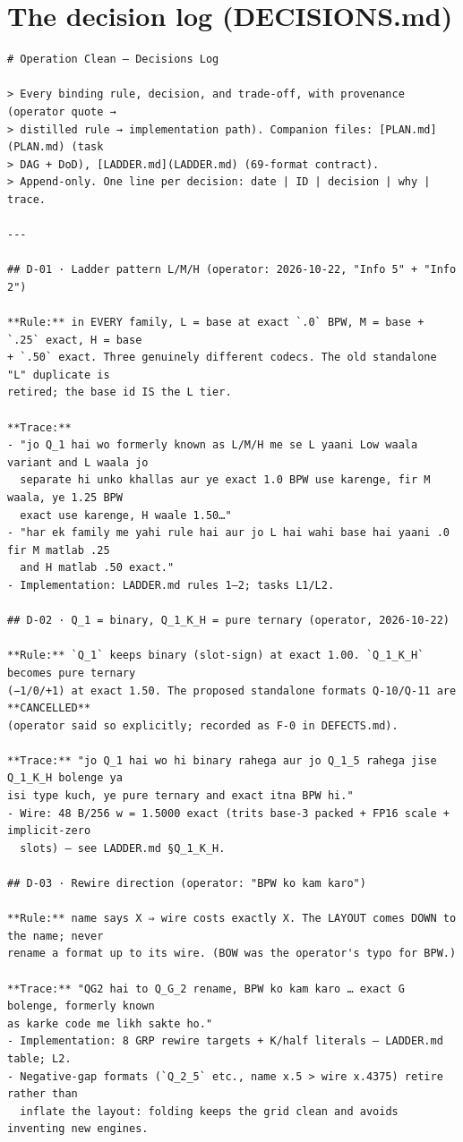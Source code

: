 \section*{The decision log (DECISIONS.md)}
\begin{verbatim}
# Operation Clean — Decisions Log

> Every binding rule, decision, and trade-off, with provenance (operator quote →
> distilled rule → implementation path). Companion files: [PLAN.md](PLAN.md) (task
> DAG + DoD), [LADDER.md](LADDER.md) (69-format contract).
> Append-only. One line per decision: date | ID | decision | why | trace.

---

## D-01 · Ladder pattern L/M/H (operator: 2026-10-22, "Info 5" + "Info 2")

**Rule:** in EVERY family, L = base at exact `.0` BPW, M = base + `.25` exact, H = base
+ `.50` exact. Three genuinely different codecs. The old standalone "L" duplicate is
retired; the base id IS the L tier.

**Trace:**
- "jo Q_1 hai wo formerly known as L/M/H me se L yaani Low waala variant and L waala jo
  separate hi unko khallas aur ye exact 1.0 BPW use karenge, fir M waala, ye 1.25 BPW
  exact use karenge, H waale 1.50…"
- "har ek family me yahi rule hai aur jo L hai wahi base hai yaani .0 fir M matlab .25
  and H matlab .50 exact."
- Implementation: LADDER.md rules 1–2; tasks L1/L2.

## D-02 · Q_1 = binary, Q_1_K_H = pure ternary (operator, 2026-10-22)

**Rule:** `Q_1` keeps binary (slot-sign) at exact 1.00. `Q_1_K_H` becomes pure ternary
(−1/0/+1) at exact 1.50. The proposed standalone formats Q-10/Q-11 are **CANCELLED**
(operator said so explicitly; recorded as F-0 in DEFECTS.md).

**Trace:** "jo Q_1 hai wo hi binary rahega aur jo Q_1_5 rahega jise Q_1_K_H bolenge ya
isi type kuch, ye pure ternary and exact itna BPW hi."
- Wire: 48 B/256 w = 1.5000 exact (trits base-3 packed + FP16 scale + implicit-zero
  slots) — see LADDER.md §Q_1_K_H.

## D-03 · Rewire direction (operator: "BPW ko kam karo")

**Rule:** name says X ⇒ wire costs exactly X. The LAYOUT comes DOWN to the name; never
rename a format up to its wire. (BOW was the operator's typo for BPW.)

**Trace:** "QG2 hai to Q_G_2 rename, BPW ko kam karo … exact G bolenge, formerly known
as karke code me likh sakte ho."
- Implementation: 8 GRP rewire targets + K/half literals — LADDER.md table; L2.
- Negative-gap formats (`Q_2_5` etc., name x.5 > wire x.4375) retire rather than
  inflate the layout: folding keeps the grid clean and avoids inventing new engines.


\end{verbatim}
